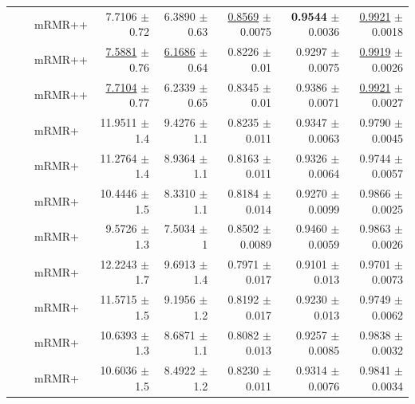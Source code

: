 \begin{longtable}{llp{}rrrrr}
 &  & mRMR++ & 7.7106 {\scriptsize $\pm$ 0.72} & 6.3890 {\scriptsize $\pm$ 0.63} & \underline{0.8569} {\scriptsize $\pm$ 0.0075} & \textbf{0.9544} {\scriptsize $\pm$ 0.0036} & \underline{0.9921} {\scriptsize $\pm$ 0.0018} \\
 &  & mRMR++ & \underline{7.5881} {\scriptsize $\pm$ 0.76} & \underline{6.1686} {\scriptsize $\pm$ 0.64} & 0.8226 {\scriptsize $\pm$ 0.01} & 0.9297 {\scriptsize $\pm$ 0.0075} & \underline{0.9919} {\scriptsize $\pm$ 0.0026} \\
 &  & mRMR++ & \underline{7.7104} {\scriptsize $\pm$ 0.77} & 6.2339 {\scriptsize $\pm$ 0.65} & 0.8345 {\scriptsize $\pm$ 0.01} & 0.9386 {\scriptsize $\pm$ 0.0071} & \underline{0.9921} {\scriptsize $\pm$ 0.0027} \\
 &  & mRMR+ & 11.9511 {\scriptsize $\pm$ 1.4} & 9.4276 {\scriptsize $\pm$ 1.1} & 0.8235 {\scriptsize $\pm$ 0.011} & 0.9347 {\scriptsize $\pm$ 0.0063} & 0.9790 {\scriptsize $\pm$ 0.0045} \\
 &  & mRMR+ & 11.2764 {\scriptsize $\pm$ 1.4} & 8.9364 {\scriptsize $\pm$ 1.1} & 0.8163 {\scriptsize $\pm$ 0.011} & 0.9326 {\scriptsize $\pm$ 0.0064} & 0.9744 {\scriptsize $\pm$ 0.0057} \\
 &  & mRMR+ & 10.4446 {\scriptsize $\pm$ 1.5} & 8.3310 {\scriptsize $\pm$ 1.1} & 0.8184 {\scriptsize $\pm$ 0.014} & 0.9270 {\scriptsize $\pm$ 0.0099} & 0.9866 {\scriptsize $\pm$ 0.0025} \\
 &  & mRMR+ & 9.5726 {\scriptsize $\pm$ 1.3} & 7.5034 {\scriptsize $\pm$ 1} & 0.8502 {\scriptsize $\pm$ 0.0089} & 0.9460 {\scriptsize $\pm$ 0.0059} & 0.9863 {\scriptsize $\pm$ 0.0026} \\
 &  & mRMR+ & 12.2243 {\scriptsize $\pm$ 1.7} & 9.6913 {\scriptsize $\pm$ 1.4} & 0.7971 {\scriptsize $\pm$ 0.017} & 0.9101 {\scriptsize $\pm$ 0.013} & 0.9701 {\scriptsize $\pm$ 0.0073} \\
 &  & mRMR+ & 11.5715 {\scriptsize $\pm$ 1.5} & 9.1956 {\scriptsize $\pm$ 1.2} & 0.8192 {\scriptsize $\pm$ 0.017} & 0.9230 {\scriptsize $\pm$ 0.013} & 0.9749 {\scriptsize $\pm$ 0.0062} \\
 &  & mRMR+ & 10.6393 {\scriptsize $\pm$ 1.3} & 8.6871 {\scriptsize $\pm$ 1.1} & 0.8082 {\scriptsize $\pm$ 0.013} & 0.9257 {\scriptsize $\pm$ 0.0085} & 0.9838 {\scriptsize $\pm$ 0.0032} \\
 &  & mRMR+ & 10.6036 {\scriptsize $\pm$ 1.5} & 8.4922 {\scriptsize $\pm$ 1.2} & 0.8230 {\scriptsize $\pm$ 0.011} & 0.9314 {\scriptsize $\pm$ 0.0076} & 0.9841 {\scriptsize $\pm$ 0.0034} \\

\end{longtable}
